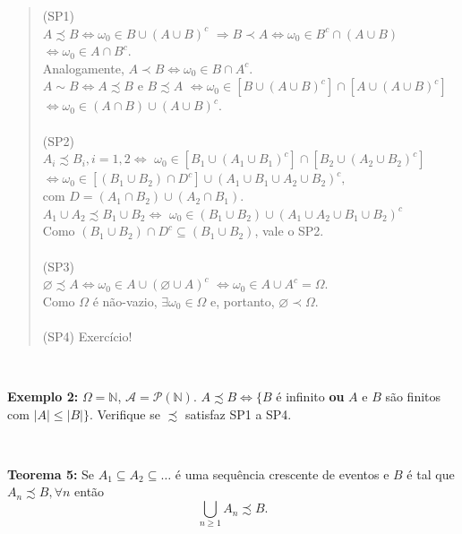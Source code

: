 \documentclass[
]{book}
\begin{document}
\begin{quote}
(SP1)\\
\(A \precsim B \Leftrightarrow \omega_0 \in B \cup (A \cup B)^c\)
\(\Rightarrow B \prec A \Leftrightarrow \omega_0 \in B^c \cap (A \cup B)\)
\(\Leftrightarrow \omega_0 \in A \cap B^c.\)\\
Analogamente, \(A \prec B \Leftrightarrow \omega_0 \in B \cap A^c.\)\\
\(A \sim B \Leftrightarrow A \precsim B\) e \(B \precsim A\)
\(\Leftrightarrow \omega_0 \in [B \cup (A \cup B)^c] \cap [A \cup (A \cup B)^c]\)
\(\Leftrightarrow \omega_0 \in (A \cap B) \cup (A \cup B)^c.\)\\
\(~\)\\
(SP2)\\
\(A_i \precsim B_i , i=1,2 \Leftrightarrow\) \(\omega_0 \in [B_1 \cup (A_1 \cup B_1)^c] \cap [B_2 \cup (A_2 \cup B_2)^c]\) \(\Leftrightarrow \omega_0 \in [(B_1 \cup B_2) \cap D^c] \cup (A_1 \cup B_1 \cup A_2 \cup B_2)^c,\)\\
com \(D = (A_1 \cap B_2) \cup (A_2 \cap B_1).\)\\
\(A_1 \cup A_2 \precsim B_1 \cup B_2 \Leftrightarrow\) \(\omega_0 \in (B_1 \cup B_2) \cup (A_1 \cup A_2 \cup B_1 \cup B_2)^c\)\\
Como \((B_1 \cup B_2) \cap D^c \subseteq (B_1 \cup B_2)\), vale o SP2.\\
\(~\)\\
(SP3)\\
\(\varnothing \precsim A \Leftrightarrow \omega_0 \in A \cup (\varnothing \cup A)^c\) \(\Leftrightarrow \omega_0 \in A \cup A^c = \Omega.\)\\
Como \(\Omega\) é não-vazio, \(\exists \omega_0 \in \Omega\) e, portanto, \(\varnothing \prec \Omega\).\\
\(~\)\\
(SP4) Exercício!
\end{quote}

\(~\)

\textbf{Exemplo 2:} \(\Omega = \mathbb{N}\), \(\mathcal{A} = \mathcal{P}(\mathbb{N})\). \(A \precsim B \Leftrightarrow \{B\) é infinito \textbf{ou} \(A\) e \(B\) são finitos com \(|A| \leq |B|\}\). Verifique se \(\precsim\) satisfaz SP1 a SP4.

\(~\)

\textbf{Teorema 5:} Se \(A_1 \subseteq A_2 \subseteq \ldots\) é uma sequência crescente de eventos e \(B\) é tal que \(A_n \precsim B, \forall n\) então \[\bigcup_{n \geq 1} A_n \precsim B.\]
\end{document}
